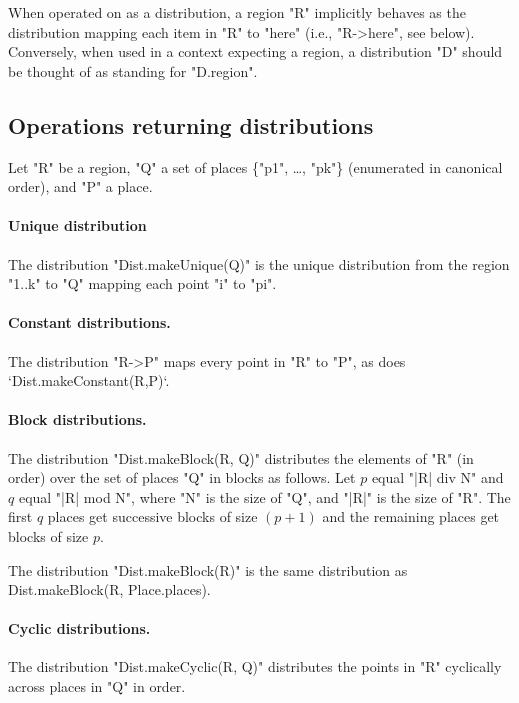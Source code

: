 When operated on as a distribution, a region \xcd"R" implicitly
behaves as the distribution mapping each item in \xcd"R" to \xcd"here"
(i.e., \xcd"R->here", see below). Conversely, when used in a context
expecting a region, a distribution \xcd"D" should be thought of as
standing for \xcd"D.region".

{}

\subsection{Operations returning distributions}

Let \xcd"R" be a region, \xcd"Q" a set of places \{\xcd"p1", \dots, \xcd"pk"\}
(enumerated in canonical order), and \xcd"P" a place.  

\paragraph{Unique distribution} 
The distribution \xcd"Dist.makeUnique(Q)" is the unique distribution from the
region \xcd"1..k" to \xcd"Q" mapping each point \xcd"i" to \xcd"pi".

\paragraph{Constant distributions.} 
The distribution \xcd"R->P" maps every point in \xcd"R" to \xcd"P", as does
\xcd`Dist.makeConstant(R,P)`. 

\paragraph{Block distributions.}
The distribution \xcd"Dist.makeBlock(R, Q)" distributes the elements of \xcd"R"
(in order) over the set of places \xcd"Q" in blocks  as
follows. Let $p$ equal \xcd"|R| div N" and $q$ equal \xcd"|R| mod N",
where \xcd"N" is the size of \xcd"Q", and 
\xcd"|R|" is the size of \xcd"R".  The first $q$ places get
successive blocks of size $(p+1)$ and the remaining places get blocks of
size $p$.

The distribution \xcd"Dist.makeBlock(R)" is the same distribution as {\cf
Dist.makeBlock(R, Place.places)}.

\paragraph{Cyclic distributions.} 
The distribution \xcd"Dist.makeCyclic(R, Q)" distributes the points in \xcd"R"
cyclically across places in \xcd"Q" in order.

